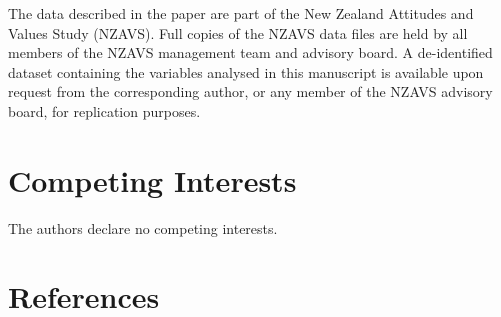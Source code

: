 \documentclass[
  man,floatsintext]{apa6}
\begin{document}
The data described in the paper are part of the New Zealand Attitudes and Values
Study (NZAVS). Full copies of the NZAVS data files are held by all members of
the NZAVS management team and advisory board. A de-identified dataset containing
the variables analysed in this manuscript is available upon request from the
corresponding author, or any member of the NZAVS advisory board, for replication
purposes.

\hypertarget{competing-interests}{%
\section{Competing Interests}\label{competing-interests}}

The authors declare no competing interests.

\newpage

\hypertarget{references}{%
\section{References}\label{references}}

\begingroup
\end{document}
